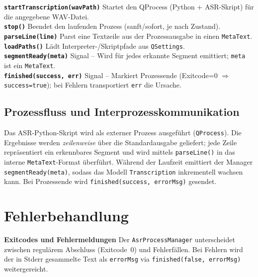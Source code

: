 \textbf{\texttt{startTranscription(wavPath)}}
Startet den QProcess (Python + ASR-Skript) für die angegebene WAV-Datei.\\

\textbf{\texttt{stop()}}
Beendet den laufenden Prozess (sanft/sofort, je nach Zustand).\\

\textbf{\texttt{parseLine(line)}}
Parst eine Textzeile aus der Prozessausgabe in einen \texttt{MetaText}.\\

\textbf{\texttt{loadPaths()}}
Lädt Interpreter-/Skriptpfade aus \texttt{QSettings}.\\

\textbf{\texttt{segmentReady(meta)}}
Signal -- Wird für jedes erkannte Segment emittiert; \texttt{meta} ist ein \texttt{MetaText}.\\

\textbf{\texttt{finished(success, err)}}
Signal -- Markiert Prozessende (Exitcode=$0$ $\Rightarrow$ \texttt{success=true}); bei Fehlern transportiert \texttt{err} die Ursache.


\subsection*{Prozessfluss und Interprozesskommunikation}

Das ASR-Python-Skript wird als externer Prozess ausgeführt (\texttt{QProcess}). Die Ergebnisse werden \emph{zeilenweise} über die Standardausgabe geliefert; jede Zeile repräsentiert ein erkennbares Segment und wird mittels \texttt{parseLine()} in das interne \texttt{MetaText}-Format überführt. Während der Laufzeit emittiert der Manager \texttt{segmentReady(meta)}, sodass das Modell \texttt{Transcription} inkrementell wachsen kann. Bei Prozessende wird \texttt{finished(success, errorMsg)} gesendet.


\section{Fehlerbehandlung}
\label{sec:py_errors}

\textbf{Exitcodes und Fehlermeldungen} Der \texttt{AsrProcessManager} unterscheidet zwischen regulärem Abschluss (Exitcode~$0$) und Fehlerfällen. Bei Fehlern wird der in Stderr gesammelte Text als \texttt{errorMsg} via \texttt{finished(false, errorMsg)} weitergereicht.\\

